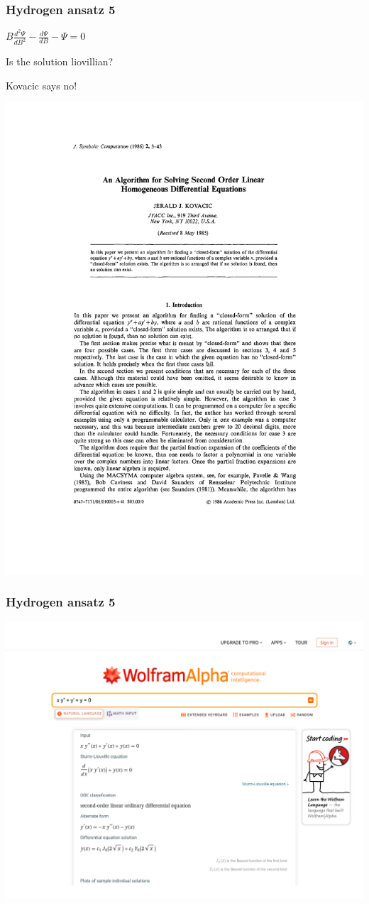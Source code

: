 \documentclass{beamer}
\begin{document}
\begin{frame}[fragile]
\frametitle{Hydrogen ansatz 5}
\small

\centerline{$B \frac{d^2\Psi}{dB^2} - \frac{d\Psi}{dB} - \Psi = 0$}
\vskip 20pt
\centerline{Is the solution liovillian?}
\centerline{Kovacic says no!}

\includegraphics[page=6,clip,trim=0in 0in 0in 5in, width=\textwidth]{Kovacic.pdf}

\end{frame}

\begin{frame}[fragile]
\frametitle{Hydrogen ansatz 5}
\includegraphics[page=1, clip, trim=0in 0in 0in 1in, width=\textwidth]{Wolfram Alpha.pdf}
\end{frame}
\end{document}
